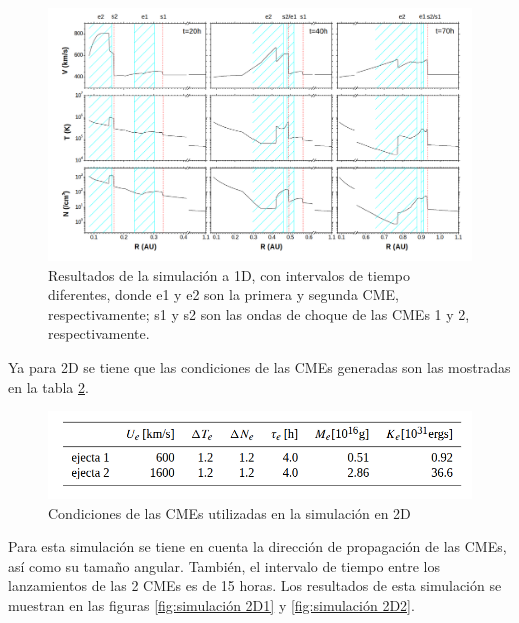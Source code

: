 \begin{figure}[H]
    \centering
    \includegraphics[width=0.8\linewidth]{imag/1D.png}
    \caption[Resultados de la simulación de una CME a 1D hecha por \cite{gonzalez-esparza-2004}]{Resultados de la simulación a 1D, con intervalos de tiempo diferentes, donde e1 y e2 son la primera y segunda CME, respectivamente; s1 y s2 son las ondas de choque de las \acp{CME} 1 y 2, respectivamente.}
    \label{fig:1D}
\end{figure}

Ya para 2D se tiene que las condiciones de las \acp{CME} generadas son las mostradas en la tabla \ref{fig:condiciones 2D}.
\begin{figure}[H]
    \centering
    \includegraphics[width=0.7\linewidth]{imag/2D condiciones.png}
    \caption{Condiciones de las \acp{CME} utilizadas en la simulación en 2D}
    \label{fig:condiciones 2D}
\end{figure}
Para esta simulación se tiene en cuenta la dirección de propagación de las CMEs, así como su tamaño angular. También, el intervalo de tiempo entre los lanzamientos de las 2 \acp{CME} es de 15 horas. Los resultados de esta simulación se muestran en las figuras \ref{fig:simulación 2D1} y \ref{fig:simulación 2D2}.

